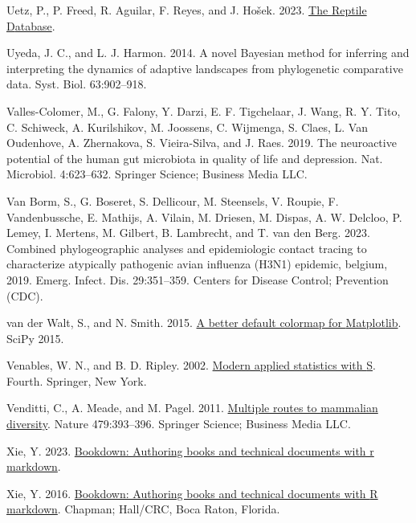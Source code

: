 \documentclass[fleqn,10pt,lineno]{wlpeerj} %
\newlength{\cslhangindent}
\newlength{\cslentryspacingunit} %
\newenvironment{CSLReferences}[2] %
 {%
  \setlength{\parindent}{0pt}
  \ifodd #1
  \let\oldpar\par
  \def\par{\hangindent=\cslhangindent\oldpar}
  \fi
  \setlength{\parskip}{#2\cslentryspacingunit}
 }%
 {}
\begin{document}
\begin{CSLReferences}{1}{0}
\leavevmode{}%
Uetz, P., P. Freed, R. Aguilar, F. Reyes, and J. Hošek. 2023. \href{http://www.reptile-database.org}{The {R}eptile {D}atabase}.

\leavevmode{}%
Uyeda, J. C., and L. J. Harmon. 2014. A novel {B}ayesian method for inferring and interpreting the dynamics of adaptive landscapes from phylogenetic comparative data. Syst. Biol. 63:902--918.

\leavevmode{}%
Valles-Colomer, M., G. Falony, Y. Darzi, E. F. Tigchelaar, J. Wang, R. Y. Tito, C. Schiweck, A. Kurilshikov, M. Joossens, C. Wijmenga, S. Claes, L. Van Oudenhove, A. Zhernakova, S. Vieira-Silva, and J. Raes. 2019. The neuroactive potential of the human gut microbiota in quality of life and depression. Nat. Microbiol. 4:623--632. Springer Science; Business Media LLC.

\leavevmode{}%
Van Borm, S., G. Boseret, S. Dellicour, M. Steensels, V. Roupie, F. Vandenbussche, E. Mathijs, A. Vilain, M. Driesen, M. Dispas, A. W. Delcloo, P. Lemey, I. Mertens, M. Gilbert, B. Lambrecht, and T. van den Berg. 2023. Combined phylogeographic analyses and epidemiologic contact tracing to characterize atypically pathogenic avian influenza ({H3N1}) epidemic, belgium, 2019. Emerg. Infect. Dis. 29:351--359. Centers for Disease Control; Prevention (CDC).

\leavevmode{}%
van der Walt, S., and N. Smith. 2015. \href{https://youtu.be/xAoljeRJ3lU}{A better default colormap for {Matplotlib}}. SciPy 2015.

\leavevmode{}%
Venables, W. N., and B. D. Ripley. 2002. \href{https://www.stats.ox.ac.uk/pub/MASS4/}{Modern applied statistics with {S}}. Fourth. Springer, New York.

\leavevmode{}%
Venditti, C., A. Meade, and M. Pagel. 2011. \href{https://doi.org/10.1038/nature10516}{Multiple routes to mammalian diversity}. Nature 479:393--396. Springer Science; Business Media {LLC}.

\leavevmode{}%
Xie, Y. 2023. \href{https://github.com/rstudio/bookdown}{Bookdown: Authoring books and technical documents with r markdown}.

\leavevmode{}%
Xie, Y. 2016. \href{https://bookdown.org/yihui/bookdown}{Bookdown: Authoring books and technical documents with {R} markdown}. Chapman; Hall/CRC, Boca Raton, Florida.


\end{CSLReferences}
\end{document}
